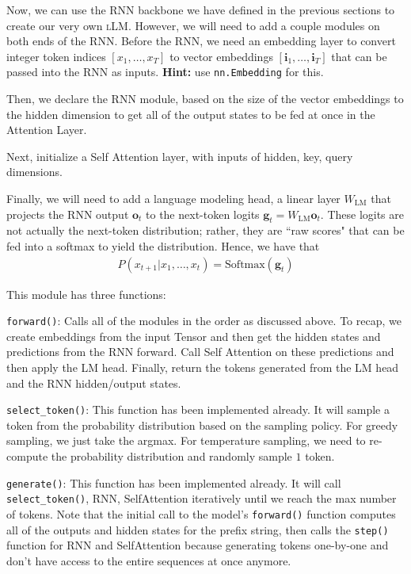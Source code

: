 \documentclass[11pt,addpoints,answers]{exam}
\newcommand{\gv}{\mathbf{g}}
\newcommand{\iv}{\mathbf{i}}
\newcommand{\ov}{\mathbf{o}}
\begin{document}
Now, we can use the RNN backbone we have defined in the previous sections to create our very own \textsc{l}LM. However, we will need to add a couple modules on both ends of the RNN. Before the RNN, we need an embedding layer to convert integer token indices $[x_1, \ldots, x_T]$ to vector embeddings $[\iv_1, \ldots, \iv_T]$ that can be passed into the RNN as inputs. 
\textbf{Hint:} use \texttt{nn.Embedding} for this. 

Then, we declare the RNN module, based on the size of the vector embeddings to the hidden dimension to get all of the output states to be fed at once in the Attention Layer.

Next, initialize a Self Attention layer, with inputs of hidden, key, query dimensions. 

Finally, we will need to add a language modeling head, a linear layer $W_\text{LM}$ that projects the RNN output $\ov_t$ to the next-token logits $\gv_t = W_\text{LM} \ov_t$. These logits are not actually the next-token distribution; rather, they are ``raw scores" that can be fed into a softmax to yield the distribution. Hence, we have that
\begin{align*}
    P(x_{t+1} | x_1, \ldots, x_t) = \text{Softmax}(\gv_t)
\end{align*}

This module has three functions:

\texttt{forward()}: Calls all of the modules in the order as discussed above. To recap, we create embeddings from the input Tensor and then get the hidden states and predictions from the RNN forward. Call Self Attention on these predictions and then apply the LM head. Finally, return the tokens generated from the LM head and the RNN hidden/output states.

\texttt{select\_token()}: This function has been implemented already. It will sample a token from the probability distribution based on the sampling policy. For greedy sampling, we just take the argmax. For temperature sampling, we need to re-compute the probability distribution and randomly sample $1$ token.

\texttt{generate()}: This function has been implemented already. It will call \texttt{select\_token()}, RNN, SelfAttention iteratively until we reach the max number of tokens. Note that the initial call to the model's \texttt{forward()} function computes all of the outputs and hidden states for the prefix string, then calls the \texttt{step()} function for RNN and SelfAttention because generating tokens one-by-one and don't have access to the entire sequences at once anymore.
\end{document}
